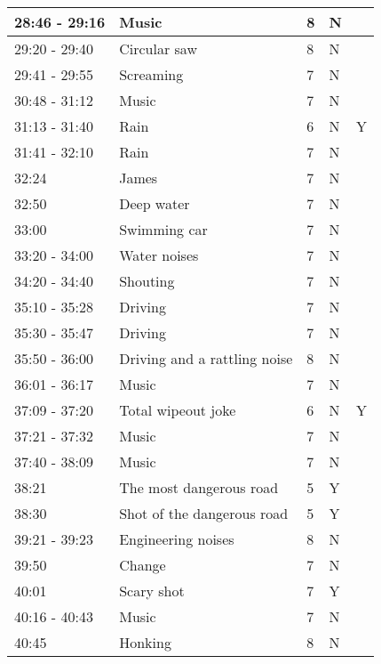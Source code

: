 \begin{longtable}{| p{70pt} | p{130pt} | p{45pt} | p{57pt} | p{60pt}|}
28:46 - 29:16     &     Music     &     8     &     N& \\\hline
29:20 - 29:40     &     Circular saw     &     8     &     N& \\\hline
29:41 - 29:55     &     Screaming     &     7     &     N& \\\hline
30:48 - 31:12     &     Music     &     7     &     N& \\\hline
31:13 - 31:40     &     Rain     &     6     &     N&Y \\\hline
31:41 - 32:10     &     Rain     &     7     &     N& \\\hline
32:24     &     James     &     7     &     N& \\\hline
32:50     &     Deep water     &     7     &     N& \\\hline
33:00     &     Swimming car     &     7     &     N& \\\hline
33:20 - 34:00     &     Water noises     &     7     &     N& \\\hline
34:20 - 34:40     &     Shouting     &     7     &     N& \\\hline
35:10 - 35:28     &     Driving     &     7     &     N& \\\hline
35:30 - 35:47     &     Driving     &     7     &     N& \\\hline
35:50 - 36:00     &     Driving and a rattling noise     &     8     &     N& \\\hline
36:01 - 36:17     &     Music     &     7     &     N& \\\hline
37:09 - 37:20     &     Total wipeout joke     &     6     &     N&Y \\\hline
37:21 - 37:32     &     Music     &     7     &     N& \\\hline
37:40 - 38:09     &     Music     &     7     &     N& \\\hline
38:21     &     The most dangerous road     &     5     &     Y& \\\hline
38:30     &     Shot of the dangerous road     &     5     &     Y& \\\hline
39:21 - 39:23     &     Engineering noises     &     8     &     N& \\\hline
39:50     &     Change     &     7     &     N& \\\hline
40:01     &     Scary shot     &     7     &     Y& \\\hline
40:16 - 40:43     &     Music     &     7     &     N& \\\hline
40:45     &     Honking     &     8     &     N& \\\hline

\end{longtable}
